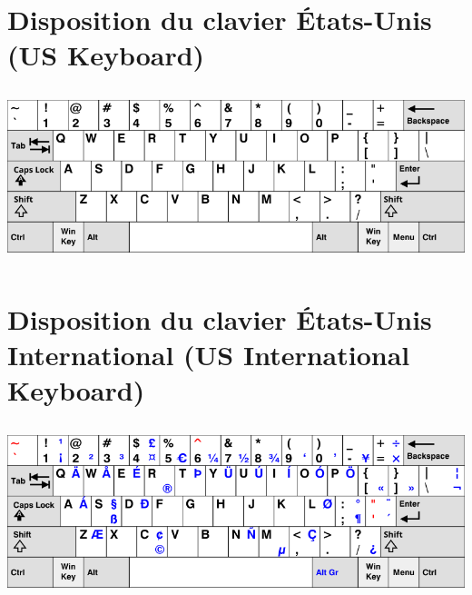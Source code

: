\documentclass[10pt,a4paper]{article}
\begin{document}
\cheatsheet

\section{Disposition du clavier États-Unis (US Keyboard)}
\begin{center}
  \includegraphics[height=5cm]{us.png}
\end{center}

\section{Disposition du clavier États-Unis International (US International Keyboard)}
\begin{center}
  \includegraphics[height=5cm]{us-international.png}
\end{center}
\end{document}

